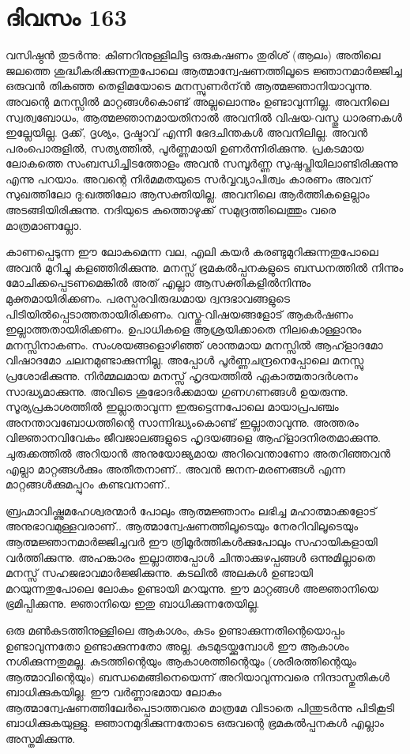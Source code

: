 \section{ദിവസം 163}


വസിഷ്ഠൻ തുടർന്നു: കിണറിനുള്ളിലിട്ട ഒരുകഷണം തുരിശ് (ആലം) അതിലെ ജലത്തെ  ശുദ്ധീകരിക്കുന്നതുപോലെ ആത്മാന്വേഷണത്തിലൂടെ ജ്ഞാനമാർജ്ജിച്ച ഒരുവൻ തികഞ്ഞ തെളിമയോടെ മനസ്സുണർന്ന്‍ ആത്മജ്ഞാനിയാവുന്നു. അവന്റെ മനസ്സിൽ മാറ്റങ്ങൾകൊണ്ട് അല്ലലൊന്നും ഉണ്ടാവുന്നില്ല. അവനിലെ സ്വത്വബോധം, ആത്മജ്ഞാനമായതിനാൽ അവനിൽ വിഷയ-വസ്തു ധാരണകൾ ഇല്ലേയില്ല. ദൃക്ക്, ദൃശ്യം, ദൃഷ്ടാവ് എന്നീ ഭേദചിന്തകൾ അവനിലില്ല. അവൻ പരംപൊരുളിൽ, സത്യത്തിൽ, പൂർണ്ണമായി ഉണർന്നിരിക്കുന്നു. പ്രകടമായ ലോകത്തെ സംബന്ധിച്ചിടത്തോളം അവൻ സമ്പൂർണ്ണ സുഷുപ്തിയിലാണ്ടിരിക്കുന്നു എന്നു പറയാം. അവന്റെ നിർമമതയുടെ സർവ്വവ്യാപിത്വം കാരണം അവന്‌ സുഖത്തിലോ ദു:ഖത്തിലോ ആസക്തിയില്ല. അവനിലെ ആർത്തികളെല്ലാം അടങ്ങിയിരിക്കുന്നു. നദിയുടെ കുത്തൊഴുക്ക് സമുദ്രത്തിലെത്തും വരെ മാത്രമാണല്ലോ.

കാണപ്പെടുന്ന ഈ ലോകമെന്ന വല, എലി കയർ കരണ്ടുമുറിക്കുന്നതുപോലെ അവൻ മുറിച്ചു കളഞ്ഞിരിക്കുന്നു. മനസ്സ് ഭ്രമകല്‍പ്പനകളുടെ ബന്ധനത്തിൽ നിന്നും മോചിക്കപ്പെടണമെങ്കിൽ അത് എല്ലാ ആസക്തികളിൽനിന്നും മുക്തമായിരിക്കണം. പരസ്പരവിരുദ്ധമായ ദ്വന്ദഭാവങ്ങളുടെ പിടിയിൽപ്പെടാത്തതായിരിക്കണം. വസ്തു-വിഷയങ്ങളോട് ആകർഷണം ഇല്ലാത്തതായിരിക്കണം. ഉപാധികളെ ആശ്രയിക്കാതെ നിലകൊള്ളാനും മനസ്സിനാകണം. സംശയങ്ങളൊഴിഞ്ഞ് ശാന്തമായ മനസ്സിൽ ആഹ്ളാദമോ വിഷാദമോ ചലനമുണ്ടാക്കുന്നില്ല. അപ്പോൾ പൂർണ്ണചന്ദ്രനെപ്പോലെ മനസ്സു പ്രശോഭിക്കുന്നു. നിർമ്മലമായ മനസ്സ് ഹൃദയത്തിൽ ഏകാത്മതാദർശനം സാദ്ധ്യമാക്കുന്നു. അവിടെ ശുഭോദർക്കമായ ഗുണഗണങ്ങൾ ഉയരുന്നു. സൂര്യപ്രകാശത്തിൽ ഇല്ലാതാവുന്ന ഇരുട്ടെന്നപോലെ മായാപ്രപഞ്ചം അനന്താവബോധത്തിന്റെ സാന്നിദ്ധ്യംകൊണ്ട് ഇല്ലാതാവുന്നു. അത്തരം വിജ്ഞാനവിവേകം ജീവജാലങ്ങളുടെ ഹൃദയങ്ങളെ ആഹ്ളാദനിരതമാക്കുന്നു. ചുരുക്കത്തിൽ അറിയാൻ അനുയോജ്യമായ അറിവെന്താണോ അതറിഞ്ഞവൻ എല്ലാ മാറ്റങ്ങൾക്കും അതീതനാണ്‌.. അവൻ ജനന-മരണങ്ങൾ എന്ന മാറ്റങ്ങൾക്കുമപ്പുറം കണ്ടവനാണ്‌..

ബ്രഹ്മാവിഷ്ണുമഹേശ്വരന്മാർ പോലും ആത്മജ്ഞാനം ലഭിച്ച മഹാത്മാക്കളോട് അനുഭാവമുള്ളവരാണ്‌.. ആത്മാന്വേഷണത്തിലൂടെയും നേരറിവിലൂടെയും ആത്മജ്ഞാനമാർജ്ജിച്ചവർ ഈ ത്രിമൂർത്തികൾക്കുപോലും സഹായികളായി വർത്തിക്കുന്നു. അഹങ്കാരം ഇല്ലാത്തപ്പോൾ ചിന്താക്കുഴപ്പങ്ങൾ ഒന്നുമില്ലാതെ മനസ്സ് സഹജഭാവമാർജ്ജിക്കുന്നു. കടലിൽ അലകൾ ഉണ്ടായി മറയുന്നതുപോലെ ലോകം ഉണ്ടായി മറയുന്നു. ഈ മാറ്റങ്ങൾ അജ്ഞാനിയെ ഭ്രമിപ്പിക്കുന്നു. ജ്ഞാനിയെ ഇതു ബാധിക്കുന്നതേയില്ല.

ഒരു മൺകുടത്തിനുള്ളിലെ ആകാശം, കുടം ഉണ്ടാക്കുന്നതിന്റെയൊപ്പം ഉണ്ടാവുന്നതോ ഉണ്ടാക്കുന്നതോ അല്ല. കുടമുടയ്ക്കുമ്പോൾ ഈ ആകാശം നശിക്കുന്നതുമല്ല. കുടത്തിന്റെയും ആകാശത്തിന്റെയും (ശരീരത്തിന്റെയും ആത്മാവിന്റെയും) ബന്ധമെങ്ങിനെയെന്ന് അറിയാവുന്നവരെ നിന്ദാസ്തുതികൾ ബാധിക്കുകയില്ല. ഈ വർണ്ണാഭമായ ലോകം ആത്മാന്വേഷണത്തിലേർപ്പെടാത്തവരെ മാത്രമേ വിടാതെ പിന്തുടർന്നു പിടികൂടി ബാധിക്കുകയുള്ളു. ജ്ഞാനമുദിക്കുന്നതോടെ ഒരുവന്റെ ഭ്രമകൽപ്പനകൾ എല്ലാം അസ്തമിക്കുന്നു. 

